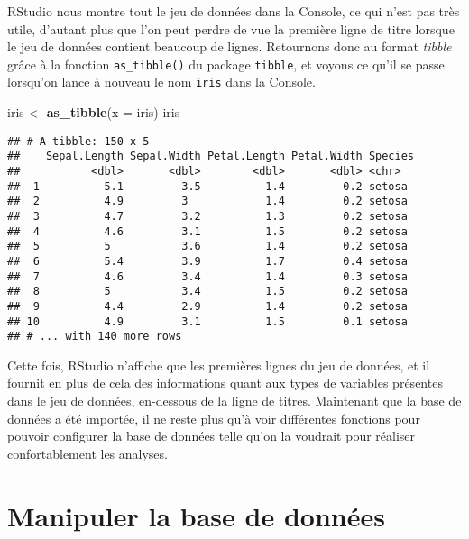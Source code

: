 \documentclass[
  french,
]{book}
\newenvironment{Shaded}{\begin{snugshade}}{\end{snugshade}}
\newcommand{\DataTypeTok}[1]{\textcolor[rgb]{0.13,0.29,0.53}{#1}}
\newcommand{\KeywordTok}[1]{\textcolor[rgb]{0.13,0.29,0.53}{\textbf{#1}}}
\newcommand{\NormalTok}[1]{#1}
\newcommand{\StringTok}[1]{\textcolor[rgb]{0.31,0.60,0.02}{#1}}
\begin{document}
RStudio nous montre tout le jeu de données dans la Console, ce qui n'est pas très utile, d'autant plus que l'on peut perdre de vue la première ligne de titre lorsque le jeu de données contient beaucoup de lignes. Retournons donc au format \emph{tibble} grâce à la fonction \texttt{as\_tibble()} du package \texttt{tibble}, et voyons ce qu'il se passe lorsqu'on lance à nouveau le nom \texttt{iris} dans la Console.

\begin{Shaded}
\begin{Highlighting}[]
\NormalTok{iris <-}\StringTok{ }\KeywordTok{as_tibble}\NormalTok{(}\DataTypeTok{x =}\NormalTok{ iris)}
\NormalTok{iris}
\end{Highlighting}
\end{Shaded}

\begin{verbatim}
## # A tibble: 150 x 5
##    Sepal.Length Sepal.Width Petal.Length Petal.Width Species
##           <dbl>       <dbl>        <dbl>       <dbl> <chr>  
##  1          5.1         3.5          1.4         0.2 setosa 
##  2          4.9         3            1.4         0.2 setosa 
##  3          4.7         3.2          1.3         0.2 setosa 
##  4          4.6         3.1          1.5         0.2 setosa 
##  5          5           3.6          1.4         0.2 setosa 
##  6          5.4         3.9          1.7         0.4 setosa 
##  7          4.6         3.4          1.4         0.3 setosa 
##  8          5           3.4          1.5         0.2 setosa 
##  9          4.4         2.9          1.4         0.2 setosa 
## 10          4.9         3.1          1.5         0.1 setosa 
## # ... with 140 more rows
\end{verbatim}

Cette fois, RStudio n'affiche que les premières lignes du jeu de données, et il fournit en plus de cela des informations quant aux types de variables présentes dans le jeu de données, en-dessous de la ligne de titres. Maintenant que la base de données a été importée, il ne reste plus qu'à voir différentes fonctions pour pouvoir configurer la base de données telle qu'on la voudrait pour réaliser confortablement les analyses.

\hypertarget{manipuler-la-base-de-donnuxe9es}{%
\section{Manipuler la base de données}\label{manipuler-la-base-de-donnuxe9es}}
\end{document}
